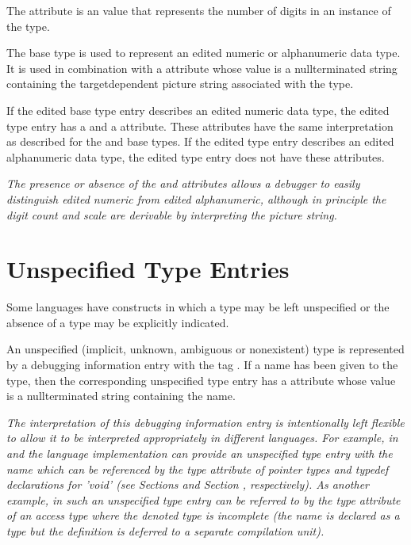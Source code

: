 The\hypertarget{chap:DWATdigitcountdigitcountforpackeddecimalornumericstringtype}{} 
\DWATdigitcountDEFN{} attribute 
is an 
value that represents the number of digits in an instance of
the type.

The\hypertarget{chap:DWATpicturestringpicturestringfornumericstringtype}{}
\DWATEedited{} base type is used to represent an edited
numeric or alphanumeric data type. It is used in combination
with a \DWATpicturestringDEFN{} attribute whose value is a 
null\dash terminated string containing the target\dash dependent picture
string associated with the type.

If the edited base type entry describes an edited numeric
data type, the edited type entry has a \DWATdigitcount{} and a
\DWATdecimalscale{} attribute.
These attributes have the same
interpretation as described for the 
\DWATEpackeddecimal{} and
\DWATEnumericstring{} base 
types. If the edited type entry
describes an edited alphanumeric data type, the edited type
entry does not have these attributes.

\textit{The presence or absence of the \DWATdigitcount{} and
\DWATdecimalscale{} attributes
allows a debugger to easily
distinguish edited numeric from edited alphanumeric, although
in principle the digit count and scale are derivable by
interpreting the picture string.}


\section{Unspecified Type Entries}
\label{chap:unspecifiedtypeentries}
Some languages have constructs in which a type 
may be left unspecified or the absence of a type
may be explicitly indicated.

An unspecified (implicit, unknown, ambiguous or nonexistent)
type is represented by a debugging information entry with
the tag \DWTAGunspecifiedtypeTARG. 
If a name has been given
to the type, then the corresponding unspecified type entry
has a \DWATname{} attribute 
whose value is
a null\dash terminated
string containing the name.
\bbeb

\textit{The interpretation of this debugging information entry is
intentionally left flexible to allow it to be interpreted
appropriately in different languages. For example, in 
 and 
the language implementation can provide an unspecified type
entry with the name  which can be referenced by the
type attribute of pointer types and typedef declarations for
'void' (see 
Sections  and 
Section , 
respectively). As another
example, in  such an unspecified type entry can be referred
to by the type attribute of an access type where the denoted
type is incomplete (the name is declared as a type but the
definition is deferred to a separate compilation unit).}


